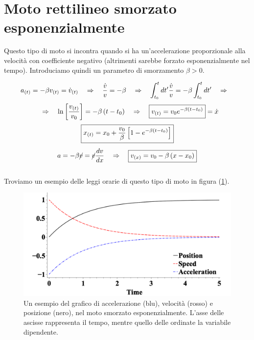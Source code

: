 \section{Moto rettilineo smorzato esponenzialmente}
\label{section:MRSE}
Questo tipo di moto si incontra quando si ha un'accelerazione proporzionale
alla velocità con coefficiente negativo (altrimenti sarebbe forzato esponenzialmente nel tempo).
Introduciamo quindi un parametro di smorzamento $\beta>0$.

\begin{equation*}
    a_{(t)} = -\beta v_{(t)} = \dot v_{(t)}\quad\Rightarrow\quad \frac{\dot v}{v} =
    -\beta \quad\Rightarrow\quad \int_{t_0}^{t}dt' \frac{\dot v}{v} =  -\beta\int_{t_0}^{t}dt'\quad\Rightarrow\quad
\end{equation*}
\begin{equation}
    \quad\Rightarrow\quad\ln{\left[ \frac{v_{(t)}}{v_0}\right]} =
    -\beta\left( t-t_0\right)\quad\Rightarrow\quad \boxed{v_{(t)} = v_0e^{-\beta\left( t-t_0\right)}} = \dot x 
\end{equation}
\begin{equation}
    \boxed{x_{(t)} = x_0 + \frac{v_0}\beta\left[1-e^{-\beta\left( t-t_0\right)}\right]}
\label{eq:MRSE}
\end{equation}
\begin{equation}
    a = -\beta \cancel{v} = \cancel{v}\frac{dv}{dx}\quad\Rightarrow\quad
    \boxed{v_{(x)} = v_0 - \beta\left( x - x_0\right)}
\label{eq:v(x)_MRSE}
\end{equation}
\\
Troviamo un esempio delle leggi orarie di questo tipo di moto in figura (\ref{fig:MRSE}).
\begin{figure}[htbp]
    \begin{center}
        \includegraphics[width=13cm]{images/MRSE.png} 
        \caption{Un esempio del grafico di accelerazione (blu), velocità (rosso)
        e posizione (nero), nel moto smorzato esponenzialmente. L'asse delle
        ascisse rappresenta il tempo, mentre quello delle ordinate
        la variabile dipendente.}
    \end{center}
\label{fig:MRSE}
\end{figure}